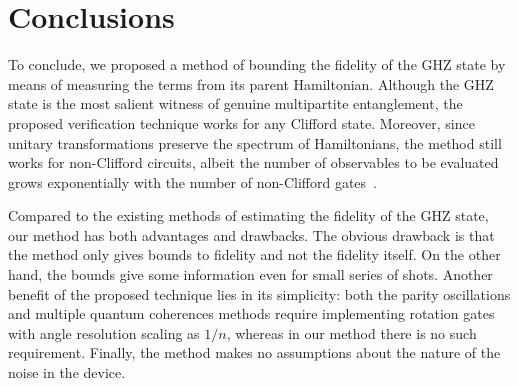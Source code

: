 \section{Conclusions}

To conclude, we proposed a method of bounding the fidelity of the GHZ state by means of measuring the terms from its parent Hamiltonian. Although the GHZ state is the most salient witness of genuine multipartite entanglement, the proposed verification technique works for any Clifford state. Moreover, since unitary transformations preserve the spectrum of Hamiltonians, the method still works for non-Clifford circuits, albeit the number of observables to be evaluated grows exponentially with the number of non-Clifford gates~\cite{biamonte_universal_2021}.

Compared to the existing methods of estimating the fidelity of the GHZ state, our method has both advantages and drawbacks. The obvious drawback is that the method only gives bounds to fidelity and not the fidelity itself. On the other hand, the bounds give some information even for small series of shots. Another benefit of the proposed technique lies in its simplicity: both the parity oscillations and multiple quantum coherences methods require implementing rotation gates with angle resolution scaling as $1/n$, whereas in our method there is no such requirement. Finally, the method makes no assumptions about the nature of the noise in the device.